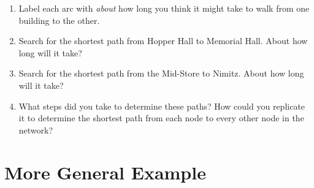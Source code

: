 \documentclass[12pt]{article}
\theoremstyle{definition}
\begin{document}

\begin{enumerate}
\item[] Label each arc with \emph{about} how long you think it might take to walk from one building to the other.
\newpage
\item Search for the shortest path from Hopper Hall to Memorial Hall. About how long will it take?
\vfill
\item Search for the shortest path from the Mid-Store to Nimitz. About how long will it take?
\vfill
\item What steps did you take to determine these paths? How could you replicate it to determine the shortest path from each node to every other node in the network?
\vfill
\end{enumerate}

\newpage


\section{More General Example}

\end{document}
